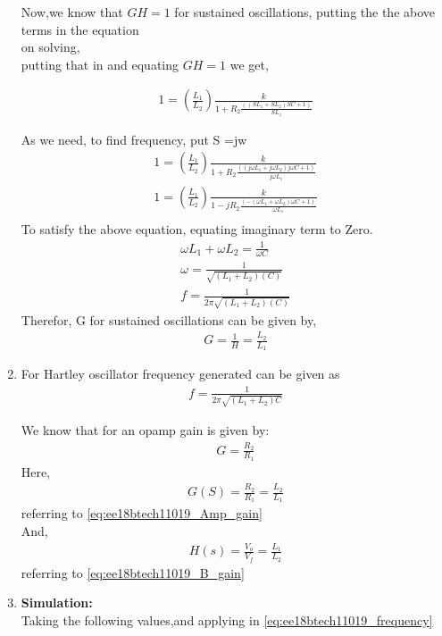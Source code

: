 \begin{enumerate}[label=\thesection.\arabic*.,ref=\thesection.\theenumi]
\solution 
Now,we know that $GH = 1$ for sustained oscillations, putting the the above terms in the equation\\
on solving,\\
    
putting that in and equating $GH=1$ we get,

\begin{align}
    1 = (\frac{L_1}{L_2})\frac{k}{1 + R_2\frac{((SL_1 + SL_2)SC + 1)}{SL_1}}
\end{align}

As we need, to find frequency, put S =jw
\begin{align}
   1 = (\frac{L_1}{L_2})\frac{k}{1 + R_2\frac{((j\omega L_1 + j\omega L_2)j\omega C + 1)}{j\omega L_1}}\\
   1 = (\frac{L_1}{L_2})\frac{k}{1 -j R_2\frac{(-(\omega L_1 + \omega L_2)\omega C + 1)}{\omega L_1}}\\
\end{align}
To satisfy the above equation, equating imaginary term to Zero.
\begin{align}    
    \omega L_1 + \omega L_2  = \frac{1}{\omega C}\\
    \omega = \frac{1}{\sqrt{(L_1+L_2)(C)}}\\
    f = \frac{1}{2\pi \sqrt{(L_1+L_2)(C)}}
\end{align}
Therefor, G for sustained oscillations can be given by,\\
\begin{align}
    G = \frac{1}{H}
     =  \frac{L_2}{L_1} 
\label{eq:ee18btech11019_Amp_gain}
\end{align}
 
\item For Hartley oscillator frequency generated can be given as 
\begin{align}
    f = \frac{1}{2\pi\sqrt{(L_1 + L_2)C}}
    \label{eq:ee18btech11019_frequency}
\end{align}

We know that for an opamp gain is given by:
\begin{align}
    G = \frac{R_2}{R_1}
\end{align}
Here,
\begin{align}
    G(S) = \frac{R_2}{R_1} = \frac{L_2}{L_1}
\end{align}
referring to \ref{eq:ee18btech11019_Amp_gain}\\
And,
\begin{align}
    H(s) = \frac{V_o}{V_f} = \frac{L_1}{L_2}
\end{align}
referring to \ref{eq:ee18btech11019_B_gain}\\
\newline
\item \textbf{Simulation:}\\
Taking the following values,and applying in \ref{eq:ee18btech11019_frequency} \\




\end{enumerate}
